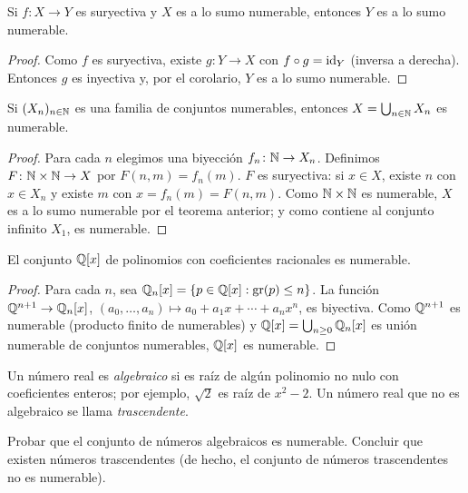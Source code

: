 \begin{theorem}
  Si \(f\colon X \to Y\) es suryectiva y \(X\) es a lo sumo numerable, entonces \(Y\) es a lo sumo numerable.
\end{theorem}

\begin{proof}
  Como \(f\) es suryectiva, existe \(g\colon Y \to X\) con \(f \circ g = \operatorname{id}_Y\) (inversa a derecha). Entonces \(g\) es inyectiva y, por el corolario, \(Y\) es a lo sumo numerable.
\end{proof}

\begin{theorem}
  Si \((X_n)_{n \in \mathbb{N}}\) es una familia de conjuntos numerables, entonces \(X = \bigcup_{n \in \mathbb{N}} X_n\) es numerable.
\end{theorem}

\begin{proof}
  Para cada \(n\) elegimos una biyección \(f_n\colon \mathbb{N} \to X_n\). Definimos \(F\colon \mathbb{N} \times \mathbb{N} \to X\) por \(F(n, m) = f_n(m)\). \(F\) es suryectiva: si \(x \in X\), existe \(n\) con \(x \in X_n\) y existe \(m\) con \(x = f_n(m) = F(n, m)\). Como \(\mathbb{N} \times \mathbb{N}\) es numerable, \(X\) es a lo sumo numerable por el teorema anterior; y como contiene al conjunto infinito \(X_1\), es numerable.
\end{proof}

\begin{eg}
  El conjunto \(\mathbb{Q}[x]\) de polinomios con coeficientes racionales es numerable.
\end{eg}

\begin{proof}
  Para cada \(n\), sea \(\mathbb{Q}_n[x] = \{ p \in \mathbb{Q}[x] : \operatorname{gr}(p) \leq n \}\). La función \(\mathbb{Q}^{n+1} \to \mathbb{Q}_n[x]\), \((a_0, \dots, a_n) \mapsto a_0 + a_1 x + \cdots + a_n x^n\), es biyectiva. Como \(\mathbb{Q}^{n+1}\) es numerable (producto finito de numerables) y \(\mathbb{Q}[x] = \bigcup_{n \geq 0} \mathbb{Q}_n[x]\) es unión numerable de conjuntos numerables, \(\mathbb{Q}[x]\) es numerable.
\end{proof}

\begin{definition}
  Un número real es \emph{algebraico} si es raíz de algún polinomio no nulo con coeficientes enteros; por ejemplo, \(\sqrt{2}\) es raíz de \(x^2 - 2\). Un número real que no es algebraico se llama \emph{trascendente}.
\end{definition}

\begin{ejercicio}
  Probar que el conjunto de números algebraicos es numerable. Concluir que existen números trascendentes (de hecho, el conjunto de números trascendentes no es numerable).
\end{ejercicio}

